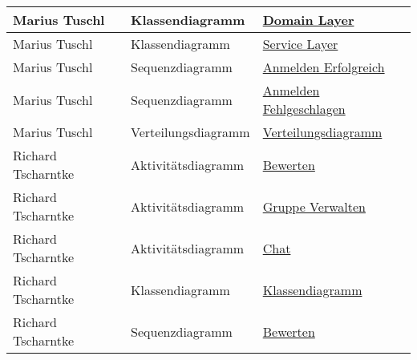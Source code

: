 \begin{tabularx}{\linewidth}{|X|X|X|}
		\hline
		Marius Tuschl&Klassendiagramm&\hyperref[fig:ClassDia_Domain_Layer]{Domain Layer}\\
		\hline
		Marius Tuschl&Klassendiagramm&\hyperref[fig:ClassDia_Service_Layer]{Service Layer}\\
		\hline
		Marius Tuschl&Sequenzdiagramm&\hyperref[fig:SeqDia_Anmelden_Erfolgreich]{Anmelden Erfolgreich}\\
		\hline
		Marius Tuschl&Sequenzdiagramm&\hyperref[fig:SeqDia_Anmelden_Fehlgeschlagen]{Anmelden Fehlgeschlagen}\\
		\hline
		Marius Tuschl&Verteilungsdiagramm&\hyperref[fig:VerteilungsDia]{Verteilungsdiagramm}\\
		\hline
		\hline
		Richard Tscharntke&Aktivitätsdiagramm&\hyperref[fig:ActDia_Bewerten]{Bewerten}\\
		\hline
		Richard Tscharntke&Aktivitätsdiagramm&\hyperref[fig:ActDia_Gruppe_Verwalten]{Gruppe Verwalten}\\
		\hline
		Richard Tscharntke&Aktivitätsdiagramm&\hyperref[fig:ActDia_Chat]{Chat}\\
		\hline
		Richard Tscharntke&Klassendiagramm&\hyperref[fig:ClassDia_Richard]{Klassendiagramm}\\
		\hline
		Richard Tscharntke&Sequenzdiagramm&\hyperref[fig:SeqDia_Bewerten]{Bewerten}\\
		\hline
		
	\end{tabularx}